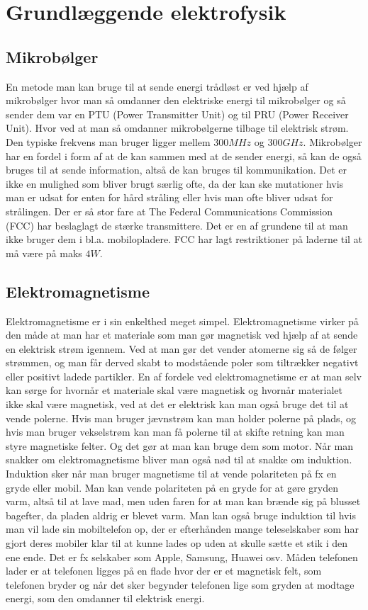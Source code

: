 \section{Grundlæggende elektrofysik}

\subsection{Mikrobølger}

En metode man kan bruge til at sende energi trådløst er ved hjælp af mikrobølger hvor man så omdanner den elektriske energi til mikrobølger og så sender dem var en PTU (Power Transmitter Unit) og til PRU (Power Receiver Unit). Hvor ved at man så omdanner mikrobølgerne tilbage til elektrisk strøm. Den typiske frekvens man bruger ligger mellem $300 MHz$ og $300 GHz$. Mikrobølger har en fordel i form af at de kan sammen med at de sender energi, så kan de også bruges til at sende information, altså de kan bruges til kommunikation.  Det er ikke en mulighed som bliver brugt særlig ofte, da der kan ske mutationer hvis man er udsat for enten for hård stråling eller hvis man ofte bliver udsat for strålingen. Der er så stor fare at The Federal Communications Commission (FCC) har beslaglagt de stærke transmittere. Det er en af grundene til at man ikke bruger dem i bl.a. mobilopladere. FCC har lagt restriktioner på laderne til at må være på maks $4 W$. \cite{mikro}

\subsection{Elektromagnetisme}
Elektromagnetisme er i sin enkelthed meget simpel. Elektromagnetisme virker på den måde at man har et materiale som man gør magnetisk ved hjælp af at sende en elektrisk strøm igennem. Ved at man gør det vender atomerne sig så de følger strømmen, og man får derved skabt to modstående poler som tiltrækker negativt eller positivt ladede partikler. En af fordele ved elektromagnetisme er at man selv kan sørge for hvornår et materiale skal være magnetisk og hvornår materialet ikke skal være magnetisk, ved at det er elektrisk kan man også bruge det til at vende polerne. Hvis man bruger jævnstrøm kan man holder polerne på plads, og hvis man bruger vekselstrøm kan man få polerne til at skifte retning kan man styre magnetiske felter. Og det gør at man kan bruge dem som motor. Når man snakker om elektromagnetisme bliver man også nød til at snakke om induktion. Induktion sker når man bruger magnetisme til at vende polariteten på fx en gryde eller mobil. Man kan vende polariteten på en gryde for at gøre gryden varm, altså til at lave mad, men uden faren for at man kan brænde sig på blusset bagefter, da pladen aldrig er blevet varm. Man kan også bruge induktion til hvis man vil lade sin mobiltelefon op, der er efterhånden mange teleselskaber som har gjort deres mobiler klar til at kunne lades op uden at skulle sætte et stik i den ene ende. Det er fx selskaber som Apple, Samsung, Huawei osv. Måden telefonen lader er at telefonen ligges på en flade hvor der er et magnetisk felt, som telefonen bryder og når det sker begynder telefonen lige som gryden at modtage energi, som den omdanner til elektrisk energi. \cite{mikro}

